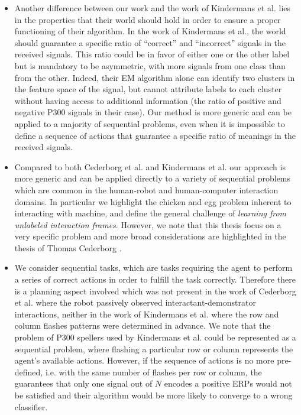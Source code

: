 \begin{itemize}
\item Another difference between our work and the work of Kindermans et al. lies in the properties that their world should hold in order to ensure a proper functioning of their algorithm. In the work of Kindermans et al., the world should guarantee a specific ratio of ``correct'' and ``incorrect'' signals in the received signals. This ratio could be in favor of either one or the other label but is mandatory to be asymmetric, with more signals from one class than from the other. Indeed, their EM algorithm alone can identify two clusters in the feature space of the signal, but cannot attribute labels to each cluster without having access to additional information (the ratio of positive and negative P300 signals in their case). Our method is more generic and can be applied to a majority of sequential problems, even when it is impossible to define a sequence of actions that guarantee a specific ratio of meanings in the received signals. 


\item Compared to both Cederborg et al. and Kindermans et al. our approach is more generic and can be applied directly to a variety of sequential problems which are common in the human-robot and human-computer interaction domains. In particular we highlight the chicken and egg problem inherent to interacting with machine, and define the general challenge of \emph{learning from unlabeled interaction frames}. However, we note that this thesis focus on a very specific problem and more broad considerations are highlighted in the thesis of Thomas Cederborg \cite{cederborg2014thesis}.

\item We consider sequential tasks, which are tasks requiring the agent to perform a series of correct actions in order to fulfill the task correctly. Therefore there is a planning aspect involved which was not present in the work of Cederborg et al. where the robot passively observed interactant-demonstrator interactions, neither in the work of Kindermans et al. where the row and column flashes patterns were determined in advance. We note that the problem of P300 spellers used by Kindermans et al. could be represented as a sequential problem, where flashing a particular row or column represents the agent's available actions. However, if the sequence of actions is no more pre-defined, i.e. with the same number of flashes per row or column, the guarantees that only one signal out of $N$ encodes a positive ERPs would not be satisfied and their algorithm would be more likely to converge to a wrong classifier.


\end{itemize}
